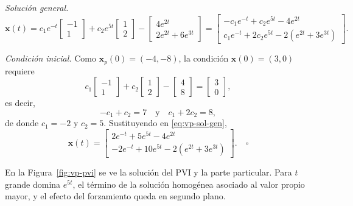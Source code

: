 \begin{example}
\emph{Soluci\'on general.}
\begin{equation}\label{eq:vp-sol-gen}
\mathbf{x}(t) = c_1 e^{-t} \begin{bmatrix} -1 \\ 1 \end{bmatrix} + c_2 e^{5t} \begin{bmatrix} 1 \\ 2 \end{bmatrix} - \begin{bmatrix} 4e^{2t} \\ 2e^{2t} + 6e^{3t} \end{bmatrix}
= \begin{bmatrix} -c_1 e^{-t} + c_2 e^{5t} - 4e^{2t} \\ c_1 e^{-t} + 2c_2 e^{5t} - 2(e^{2t} + 3e^{3t}) \end{bmatrix}.
\end{equation}

\emph{Condici\'on inicial.} Como $\mathbf x_p(0)=(-4,-8)$, la condici\'on $\mathbf{x}(0) = (3,0)$ requiere
\[
c_1 \begin{bmatrix} -1 \\ 1 \end{bmatrix} + c_2 \begin{bmatrix} 1 \\ 2 \end{bmatrix} - \begin{bmatrix} 4 \\ 8 \end{bmatrix} = \begin{bmatrix} 3 \\ 0 \end{bmatrix},
\]
es decir,
\[
-c_1 + c_2 = 7 \quad \text{y} \quad c_1 + 2c_2 = 8,
\]
de donde $c_1 = -2$ y $c_2 = 5$. Sustituyendo en \eqref{eq:vp-sol-gen},
\[
\mathbf{x}(t) = \begin{bmatrix} 2e^{-t} + 5e^{5t} - 4e^{2t} \\ -2e^{-t} + 10e^{5t} - 2(e^{2t} + 3e^{3t}) \end{bmatrix}. \quad \square
\]
\end{example}

En la Figura~\ref{fig:vp-pvi} se ve la soluci\'on del PVI y la parte particular. Para $t$ grande domina $e^{5t}$, el t\'ermino de la soluci\'on homog\'enea asociado al valor propio mayor, y el efecto del forzamiento queda en segundo plano.

